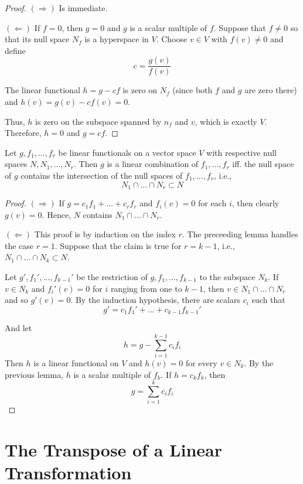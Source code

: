 \begin{proof}
	$(\Rightarrow)$ Is immediate.

	$(\Leftarrow)$ If $f = 0$, then $g = 0$ and $g$ is a scalar multiple of $f$. Suppose that $f \neq 0$ so that its null space $N_f$ is a hyperspace in $V$. Choose $v \in V$ with $f(v) \neq 0$ and define
	\[
		c = \frac{g(v)}{f(v)}
	\]

	The linear functional $h = g - cf$ is zero on $N_f$ (since both $f$ and $g$ are zero there) and $h(v) = g(v) - cf(v) = 0$.

	Thus, $h$ is zero on the subspace spanned by $n_f$ and $v$, which is exactly $V$. Therefore, $h = 0$ and $g = cf$.
\end{proof}

\begin{theorem}
	Let $g, f_1, \ldots, f_r$ be linear functionals on a vector space $V$ with respective null spaces $N, N_1, \ldots, N_r$. Then $g$ is a linear combination of $f_1, \ldots, f_r$ iff. the null space of $g$ contains the intersection of the null spaces of $f_1, \ldots, f_r$, i.e.,
	\[
		N_1 \cap \ldots \cap N_r \subset N
	\]
\end{theorem}

\begin{proof}
	$(\Rightarrow)$ If $g = c_1 f_1 + \ldots + c_r f_r$ and $f_i(v) = 0$ for each $i$, then clearly $g(v) = 0$. Hence, $N$ contains $N_1 \cap \ldots \cap N_r$.

	$(\Leftarrow)$ This proof is by induction on the index $r$. The preceeding lemma handles the case $r = 1$. Suppose that the claim is true for $r = k-1$, i.e., $N_1 \cap \ldots \cap N_k \subset N$. 

	Let $g', f_1', \ldots, f_{k-1}'$ be the restriction of $g, f_1, \ldots, f_{k-1}$ to the subspace $N_k$. If $v \in N_k$ and $f_i'(v) = 0$ for $i$ ranging from one to $k-1$, then $v \in N_1 \cap \ldots \cap N_r$ and so $g'(v) = 0$. By the induction hypothesis, there are scalars $c_i$ such that
	\[
		g' = c_1 f_1' + \ldots + c_{k-1} f_{k-1}'
	\]

	And let 
	\[
		h = g - \sum_{i=1}^{k-1} c_i f_i
	\]
	Then $h$ is a linear functional on $V$ and $h(v) = 0$ for every $v \in N_k$. By the previous lemma, $h$ is a scalar multiple of $f_k$. If $h = c_k f_k$, then 
	\[
		g = \sum_{i=1}^k c_i f_i
	\]
\end{proof}

\section{The Transpose of a Linear Transformation}

